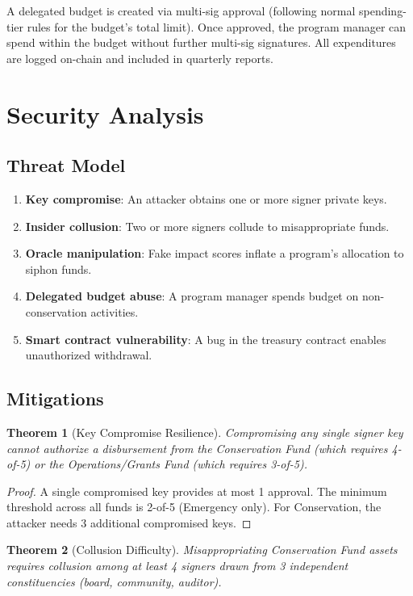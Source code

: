 \documentclass[11pt,letterpaper]{article}
\newtheorem{theorem}{Theorem}[section]
\begin{document}
A delegated budget is created via multi-sig approval (following normal spending-tier rules for the budget's total limit). Once approved, the program manager can spend within the budget without further multi-sig signatures. All expenditures are logged on-chain and included in quarterly reports.

\section{Security Analysis}

\subsection{Threat Model}

\begin{enumerate}
    \item \textbf{Key compromise}: An attacker obtains one or more signer private keys.
    \item \textbf{Insider collusion}: Two or more signers collude to misappropriate funds.
    \item \textbf{Oracle manipulation}: Fake impact scores inflate a program's allocation to siphon funds.
    \item \textbf{Delegated budget abuse}: A program manager spends budget on non-conservation activities.
    \item \textbf{Smart contract vulnerability}: A bug in the treasury contract enables unauthorized withdrawal.
\end{enumerate}

\subsection{Mitigations}

\begin{theorem}[Key Compromise Resilience]
Compromising any single signer key cannot authorize a disbursement from the Conservation Fund (which requires 4-of-5) or the Operations/Grants Fund (which requires 3-of-5).
\end{theorem}

\begin{proof}
A single compromised key provides at most 1 approval. The minimum threshold across all funds is 2-of-5 (Emergency only). For Conservation, the attacker needs 3 additional compromised keys.
\end{proof}

\begin{theorem}[Collusion Difficulty]
Misappropriating Conservation Fund assets requires collusion among at least 4 signers drawn from 3 independent constituencies (board, community, auditor).
\end{theorem}
\end{document}
